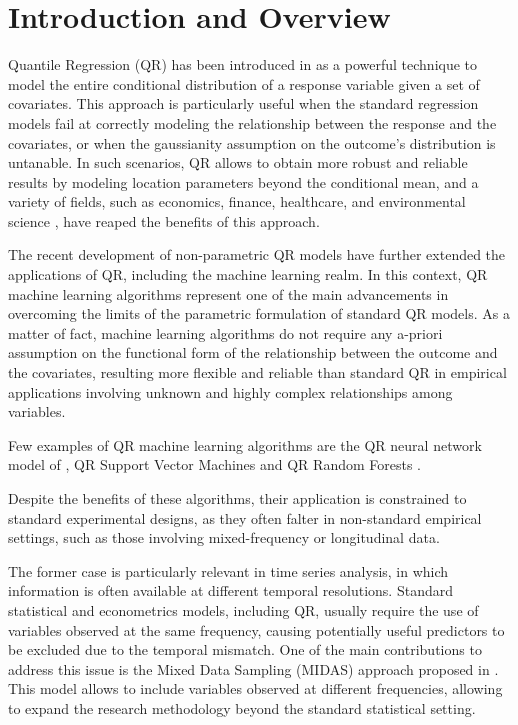 
\chapter{Introduction and Overview}
\thispagestyle{plain}
Quantile Regression (QR) has been introduced in \cite{koenker1978regression} as a powerful technique to model the entire conditional distribution of a response variable given a set of covariates. This approach is particularly useful when the standard regression models fail at correctly modeling the relationship between the response and the covariates, or when the gaussianity assumption on the outcome's distribution is untanable. In such scenarios, QR allows to obtain more robust and reliable results by modeling location parameters beyond the conditional mean, and a variety of fields, such as economics, finance, healthcare, and environmental science \citep{koenker2005quantile, koenker2017handbook}, have reaped the benefits of this approach. 
\vspace{0.15in}

\noindent The recent development of non-parametric QR models have further extended the applications of QR, including the machine learning realm. In this context, QR machine learning algorithms represent one of the main advancements in overcoming the limits of the parametric formulation of standard QR models. As a matter of fact, machine learning algorithms do not require any a-priori assumption on the functional form of the relationship between the outcome and the covariates, resulting more flexible and reliable than standard QR in empirical applications involving unknown and highly complex relationships among variables.

\vspace{0.15in}

\noindent Few examples of QR machine learning algorithms are the QR neural network model of \cite{white1992nonparametric}, QR Support Vector Machines \citep{hwang2005simple, xu2015weighted} and QR Random Forests \citep{meinshausen2006quantile, athey2019generalized}.
\vspace{0.15in}

\noindent Despite the benefits of these algorithms, their application is constrained to standard experimental designs, as they often falter in non-standard empirical settings, such as those involving mixed-frequency or longitudinal data.
\vspace{0.15in}

\noindent The former case is particularly relevant in time series analysis, in which information is often available at different temporal resolutions. Standard statistical and econometrics models, including QR, usually require the use of variables observed at the same frequency, causing potentially useful predictors to be excluded due to the temporal mismatch. One of the main contributions to address this issue is the Mixed Data Sampling (MIDAS) approach proposed in \cite{ghysels2007midas}. This model allows to include variables observed at different frequencies, allowing to expand the research methodology beyond the standard statistical setting. 

